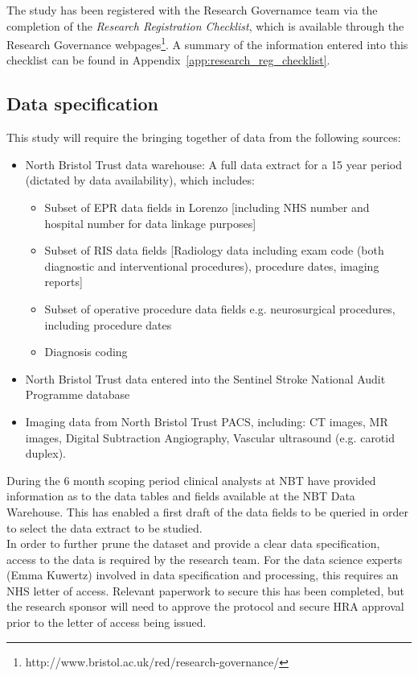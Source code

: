 \documentclass{article}
\begin{document}
The study has been registered with the Research Governamce team via
the completion of the \textit{Research Registration Checklist}, which
is available through the Research Governance
webpages\footnote{http://www.bristol.ac.uk/red/research-governance/}.
A summary of the information entered into this checklist can be found
in Appendix~\ref{app:research_reg_checklist}.

\subsection{Data specification}

This study will require the bringing together of data from the
following sources:
\begin{itemize}
\item	North Bristol Trust data warehouse: A full data extract for a 15 year period (dictated by data availability), which includes: 
  \begin{itemize}
  \item	Subset of EPR data fields in Lorenzo [including NHS number and hospital number for data linkage purposes] 
  \item	Subset of RIS data fields [Radiology data including exam code (both diagnostic and interventional procedures), procedure dates, imaging reports]
  \item	Subset of operative procedure data fields e.g. neurosurgical
    procedures, including procedure dates
  \item	Diagnosis coding
  \end{itemize}
\item	North Bristol Trust data entered into the Sentinel Stroke National Audit Programme database 
\item	Imaging data from North Bristol Trust PACS, including: CT images, MR images, Digital Subtraction Angiography, Vascular ultrasound (e.g. carotid duplex).
\end{itemize}

During the 6 month scoping period clinical analysts at NBT have
provided information as to the data tables and fields available at the
NBT Data Warehouse. This has enabled a first draft of the data fields
to be queried in order to select the data extract to be studied.\\

In order to further prune the dataset and provide a clear data
specification, access to the data is required by the research
team. For the data science experts (Emma Kuwertz) involved in data
specification and processing, this requires an NHS letter of
access. Relevant paperwork to secure this has been completed, but the
research sponsor will need to approve the protocol and secure HRA
approval prior to the letter of access being issued.\\
\end{document}
